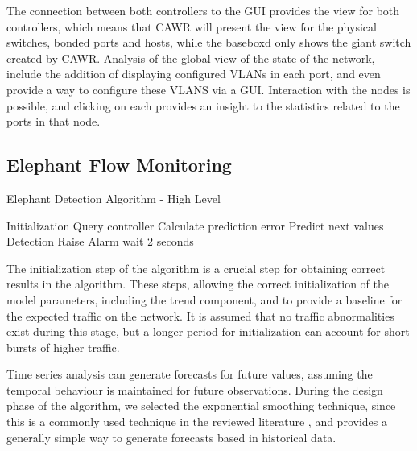 \documentclass[a4paper]{IEEEtran}
\begin{document}
The connection between both controllers to the GUI provides the view for both controllers, which means that CAWR will present the view for the physical switches, 
bonded ports and hosts, while the baseboxd only shows the giant switch created by CAWR. Analysis of the global view of the state of the
network, include the addition of displaying configured VLANs in each port, and even provide a way to configure these VLANS via a GUI. Interaction with the nodes is 
possible, and clicking on each provides an insight to the statistics related to the ports in that node.

\subsection{Elephant Flow Monitoring}

\begin{algorithm}[H]
    \caption{Elephant Detection Algorithm - High Level} \label{alg:high_level}
    \begin{algorithmic}[1]
            \State Initialization
            \State Query controller
            \Loop
                \State Calculate prediction error
                \State Predict next values
                \State Detection
                    \State Raise Alarm
                \EndIf
                \State wait 2 seconds
            \EndLoop
        \EndProcedure
       \end{algorithmic}
\end{algorithm}

\par The initialization step of the algorithm is a crucial step for obtaining correct results in the algorithm. These steps, allowing the correct initialization of
the model parameters, including the trend component, and to provide a baseline for the expected traffic on the network. It is assumed that no traffic abnormalities
exist during this stage, but a longer period for initialization can account for short bursts of higher traffic.

\par Time series analysis can generate forecasts for future values, assuming the temporal behaviour is maintained for future observations. During the design phase 
of the algorithm, we selected the exponential smoothing technique, since this is a commonly used technique in the reviewed literature \cite{jasek_usage_2013, 
munz_traffic_2010}, and provides a generally simple way to generate forecasts based in historical data.
\end{document}
